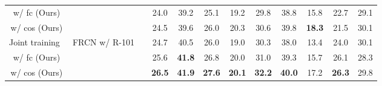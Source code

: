 \begin{table}[t]
{\begin{tabular}{c|c|c|ccc|ccc|ccc}
			\model w/ fc (Ours) &  & & 24.0 & 39.2 & 25.1 & 19.2 & 29.8 & 38.8 & 15.8 & 22.7 & 29.1  \\
			\model w/ cos (Ours) &  & & \cellcolor{Gray} 24.5 & \cellcolor{Gray} 39.6 & \cellcolor{Gray} 26.0 & \cellcolor{Gray} 20.3 & \cellcolor{Gray} 30.6 & \cellcolor{Gray} 39.8 & \cellcolor{Gray} \textbf{18.3} & \cellcolor{Gray} 21.5 & \cellcolor{Gray} 30.1
  \\\midrule
			Joint training~\cite{gupta2019lvis} & \multirow{3}{*}{FRCN w/ R-101}  & \multirow{3}{*}{\checkmark} & 24.7 & 40.5 & 26.0 & 19.0 & 30.3 & 38.0 & 13.4 & 24.0 & 30.1 \\ 
			\model w/ fc (Ours) &  & & 25.6 & \textbf{41.8} & 26.8 & 20.0 & 31.0 & 39.3 & 15.7 & 26.1 & 28.3 \\
			\model w/ cos (Ours) & & & \cellcolor{Gray} \textbf{26.5} & \cellcolor{Gray}\textbf{41.9} & \cellcolor{Gray}\textbf{27.6} & \cellcolor{Gray}\textbf{20.1} & \cellcolor{Gray}\textbf{32.2} & \cellcolor{Gray}\textbf{40.0} & \cellcolor{Gray}17.2 & \cellcolor{Gray}\textbf{26.3} & \cellcolor{Gray}29.8 \\ 
			\bottomrule
	\end{tabular}}
	\label{tab:lvis_bench}
\end{table}


